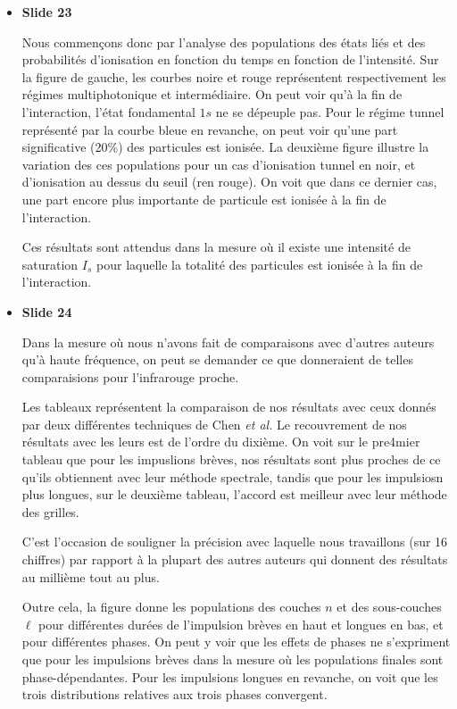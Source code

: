 \documentclass[10pt,a4paper]{article}
\begin{document}
\begin{itemize}
\item \textbf{Slide 23}\par
Nous commen\c cons donc par l'analyse des populations des
\'etats li\'es et des probabilit\'es d'ionisation en fonction du temps 
en fonction de l'intensit\'e.
Sur la figure de gauche, les courbes noire et rouge repr\'esentent 
respectivement les r\'egimes multiphotonique et interm\'ediaire.
On peut voir qu'\`a la fin de l'interaction, l'\'etat fondamental 
$1s$ ne se d\'epeuple pas.
Pour le r\'egime tunnel repr\'esent\'e par la courbe bleue en revanche, 
on peut voir qu'une part significative (20\%) des particules est ionis\'ee.
La deuxi\`eme figure illustre la variation des ces populations 
pour un cas d'ionisation tunnel en noir, et d'ionisation au dessus du seuil
(ren rouge). 
On voit que dans ce dernier cas, une part encore plus importante de 
particule est ionis\'ee \`a la fin de l'interaction.

Ces r\'esultats sont attendus dans la mesure o\`u il existe une intensit\'e 
de saturation $I_s$ pour laquelle la totalit\'e des particules
est ionis\'ee \`a la fin de l'interaction.

\item \textbf{Slide 24}\par
Dans la mesure o\`u nous n'avons fait de comparaisons avec d'autres 
auteurs qu'\`a haute fr\'equence, on peut se demander ce que donneraient 
de telles comparaisions pour l'infrarouge proche.

Les tableaux repr\'esentent la comparaison de nos r\'esultats 
avec ceux donn\'es par deux diff\'erentes techniques de Chen \textit{et al.}
Le recouvrement de nos r\'esultats avec les leurs est de l'ordre du dixi\`eme.
On voit sur le pre4mier tableau que pour les impuslions br\`eves, 
nos r\'esultats sont plus proches 
de ce qu'ils obtiennent avec leur m\'ethode spectrale, tandis que pour les 
impulsiosn plus longues, sur le deuxi\`eme tableau, l'accord est meilleur
avec leur m\'ethode des grilles.

C'est l'occasion de souligner la pr\'ecision avec laquelle nous travaillons 
(sur 16 chiffres) par rapport \`a la plupart des autres auteurs 
qui donnent des r\'esultats au milli\`eme tout au plus.

Outre cela, la figure donne les populations des couches $n$ 
et des sous-couches $\ell$ pour diff\'erentes dur\'ees de l'impulsion 
br\`eves en haut et longues en bas, et pour diff\'erentes phases.
On peut y voir que les effets de phases ne s'expriment que pour les impulsions 
br\`eves dans la mesure o\`u les populations finales sont phase-d\'ependantes.
Pour les impulsions longues en revanche, on voit que les trois distributions 
relatives aux trois phases convergent.


\end{itemize}
\end{document}
